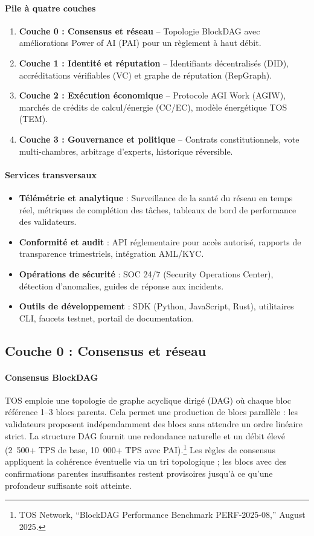 \documentclass[11pt]{article}
\begin{document}
\paragraph{Pile à quatre couches}
\begin{enumerate}[noitemsep]
  \item \textbf{Couche 0 : Consensus et réseau} -- Topologie BlockDAG avec améliorations Power of AI (PAI) pour un règlement à haut débit.
  \item \textbf{Couche 1 : Identité et réputation} -- Identifiants décentralisés (DID), accréditations vérifiables (VC) et graphe de réputation (RepGraph).
  \item \textbf{Couche 2 : Exécution économique} -- Protocole AGI Work (AGIW), marchés de crédits de calcul/énergie (CC/EC), modèle énergétique TOS (TEM).
  \item \textbf{Couche 3 : Gouvernance et politique} -- Contrats constitutionnels, vote multi-chambres, arbitrage d'experts, historique réversible.
\end{enumerate}

\paragraph{Services transversaux}
\begin{itemize}[noitemsep]
  \item \textbf{Télémétrie et analytique} : Surveillance de la santé du réseau en temps réel, métriques de complétion des tâches, tableaux de bord de performance des validateurs.
  \item \textbf{Conformité et audit} : API réglementaire pour accès autorisé, rapports de transparence trimestriels, intégration AML/KYC.
  \item \textbf{Opérations de sécurité} : SOC 24/7 (Security Operations Center), détection d'anomalies, guides de réponse aux incidents.
  \item \textbf{Outils de développement} : SDK (Python, JavaScript, Rust), utilitaires CLI, faucets testnet, portail de documentation.
\end{itemize}

\subsection{Couche 0 : Consensus et réseau}
\paragraph{Consensus BlockDAG} TOS emploie une topologie de graphe acyclique dirigé (DAG) où chaque bloc référence 1--3 blocs parents. Cela permet une production de blocs parallèle : les validateurs proposent indépendamment des blocs sans attendre un ordre linéaire strict. La structure DAG fournit une redondance naturelle et un débit élevé (2~500+ TPS de base, 10~000+ TPS avec PAI).\footnote{TOS Network, ``BlockDAG Performance Benchmark PERF-2025-08,'' August 2025.} Les règles de consensus appliquent la cohérence éventuelle via un tri topologique ; les blocs avec des confirmations parentes insuffisantes restent provisoires jusqu'à ce qu'une profondeur suffisante soit atteinte.
\end{document}

